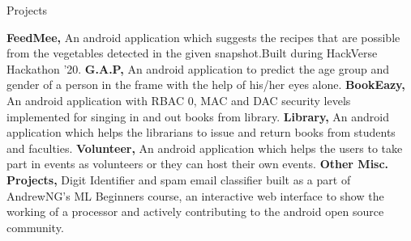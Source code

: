 \begin{rubric}{Projects}

\entry* \textbf{FeedMee,} An android application which suggests the recipes that are possible from the vegetables detected in the given snapshot.Built during HackVerse Hackathon '20.  
\entry* \textbf{G.A.P,} An android application to predict the age group and gender of a person in the frame with the help of his/her eyes alone.
\entry* \textbf{BookEazy,} An android application with RBAC 0, MAC and DAC security levels implemented for singing in and out books from library. 
\entry* \textbf{Library,} An android application which helps the librarians to issue and return books from students and faculties.
\entry* \textbf{Volunteer,} An android application which helps the users to take part in events as volunteers or they can host their own events.
\entry* \textbf{Other Misc. Projects,} Digit Identifier and spam email classifier built as a part of AndrewNG's ML Beginners course, an interactive web interface to show the working of a processor and actively contributing to the android open source community.
\end{rubric}